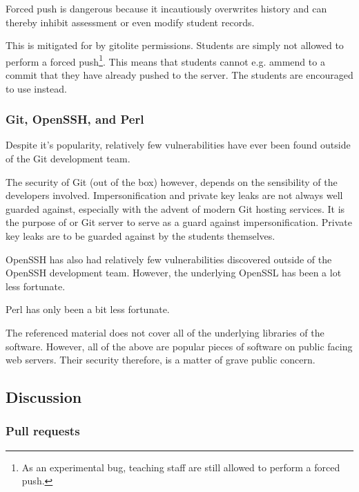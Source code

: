 Forced push is dangerous because it incautiously overwrites history and can
thereby inhibit assessment or even modify student records.

This is mitigated for by gitolite permissions. Students are simply not allowed
to perform a forced push\footnote{As an experimental bug, teaching staff are
still allowed to perform a forced push.}. This means that students cannot e.g.
ammend to a commit that they have already pushed to the server. The students
are encouraged to use \cite{man-1-git-revert} instead.

\subsubsection{Git, OpenSSH, and Perl}

Despite it's popularity, relatively few vulnerabilities have ever been found
outside of the Git development team\cite{cvedetails-com-2014a}.

The security of Git (out of the box) however, depends on the sensibility of the
developers involved. Impersonification and private key leaks are not always
well guarded against\cite{gerwitz-2013}, especially with the advent of modern
Git hosting services\cite{homakov-2012,huang-2013,homakov-2014}. It is the
purpose of or Git server to serve as a guard against impersonification. Private
key leaks are to be guarded against by the students themselves. 

OpenSSH has also had relatively few vulnerabilities discovered outside of the
OpenSSH development team\cite{cvedetails-com-2014b}. However, the underlying
OpenSSL has been a lot less fortunate\cite{cvedetails-com-2014c}.

Perl has only been a bit less fortunate\cite{cvedetails-com-2014d}.

The referenced material does not cover all of the underlying libraries of the
software. However, all of the above are popular pieces of software on public
facing web servers.  Their security therefore, is a matter of grave public
concern.

\subsection{Discussion}

\subsubsection{Pull requests}

